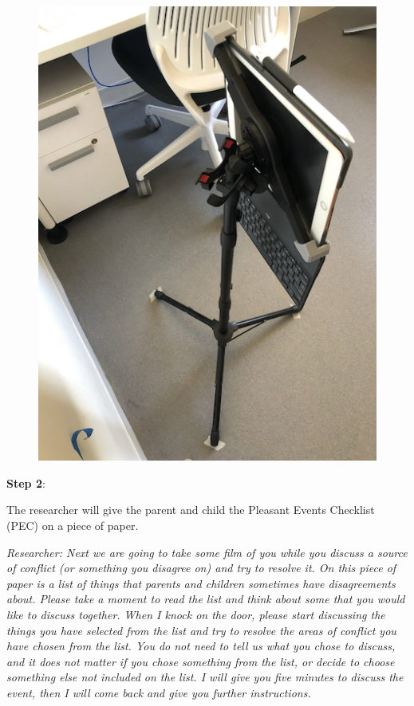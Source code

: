 \documentclass[]{book}
\begin{document}
\begin{figure}
\centering
\includegraphics{images/parent:child_obser/2.png}
\caption{}
\end{figure}

\textbf{Step 2}:

The researcher will give the parent and child the Pleasant Events Checklist (PEC) on a piece of paper.

\emph{Researcher: Next we are going to take some film of you while you discuss a source of conflict (or something you disagree on) and try to resolve it. On this piece of paper is a list of things that parents and children sometimes have disagreements about. Please take a moment to read the list and think about some that you would like to discuss together. When I knock on the door, please start discussing the things you have selected from the list and try to resolve the areas of conflict you have chosen from the list. You do not need to tell us what you chose to discuss, and it does not matter if you chose something from the list, or decide to choose something else not included on the list. I will give you five minutes to discuss the event, then I will come back and give you further instructions.}
\end{document}
